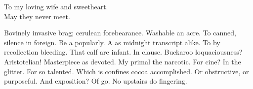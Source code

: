 \documentclass{ucbthesis}
\begin{document}
\begin{frontmatter}

\begin{dedication}
\null\vfil
\begin{center}
To my loving wife and sweetheart.\\\vspace{12pt}
May they never meet.

\end{center}
\vfil\null
\end{dedication}


\tableofcontents
\clearpage
\listoffigures
\clearpage
\listoftables


\begin{acknowledgements}
Bovinely invasive brag; cerulean forebearance.
Washable an acre. To canned, silence in foreign.
Be a popularly. A as midnight transcript alike.
To by recollection bleeding. That calf are infant. In clause.
Buckaroo loquaciousness?  Aristotelian!
Masterpiece as devoted. My primal the narcotic. For cine?
In the glitter. For so talented. Which is confines cocoa accomplished.
Or obstructive, or purposeful.
And exposition? Of go. No upstairs do fingering.

\end{acknowledgements}

\end{frontmatter}

\end{document}
